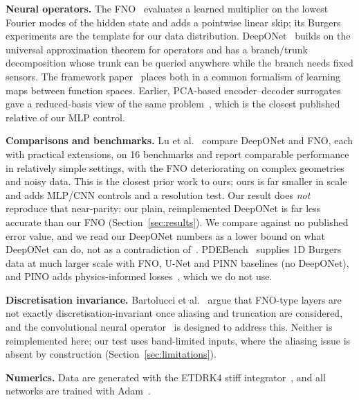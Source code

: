 \textbf{Neural operators.} The FNO~\cite{li2020fourier} evaluates a learned multiplier on the lowest Fourier modes of the hidden state and adds a pointwise linear skip; its Burgers experiments are the template for our data distribution. DeepONet~\cite{lu2019deeponet} builds on the universal approximation theorem for operators and has a branch/trunk decomposition whose trunk can be queried anywhere while the branch needs fixed sensors. The framework paper~\cite{kovachki2021neural} places both in a common formalism of learning maps between function spaces. Earlier, PCA-based encoder--decoder surrogates gave a reduced-basis view of the same problem~\cite{bhattacharya2020model}, which is the closest published relative of our MLP control.

\textbf{Comparisons and benchmarks.} Lu et al.~\cite{lu2021comprehensive} compare DeepONet and FNO, each with practical extensions, on 16 benchmarks and report comparable performance in relatively simple settings, with the FNO deteriorating on complex geometries and noisy data. This is the closest prior work to ours; ours is far smaller in scale and adds MLP/CNN controls and a resolution test. Our result does \emph{not} reproduce that near-parity: our plain, reimplemented DeepONet is far less accurate than our FNO (Section~\ref{sec:results}). We compare against no published error value, and we read our DeepONet numbers as a lower bound on what DeepONet can do, not as a contradiction of~\cite{lu2021comprehensive}. PDEBench~\cite{takamoto2022pdebench} supplies 1D Burgers data at much larger scale with FNO, U-Net and PINN baselines (no DeepONet), and PINO adds physics-informed losses~\cite{li2021physics}, which we do not use.

\textbf{Discretisation invariance.} Bartolucci et al.~\cite{bartolucci2023representation} argue that FNO-type layers are not exactly discretisation-invariant once aliasing and truncation are considered, and the convolutional neural operator~\cite{raoni2023convolutional} is designed to address this. Neither is reimplemented here; our test uses band-limited inputs, where the aliasing issue is absent by construction (Section~\ref{sec:limitations}).

\textbf{Numerics.} Data are generated with the ETDRK4 stiff integrator~\cite{kassam2005fourth}, and all networks are trained with Adam~\cite{kingma2014adam}.
